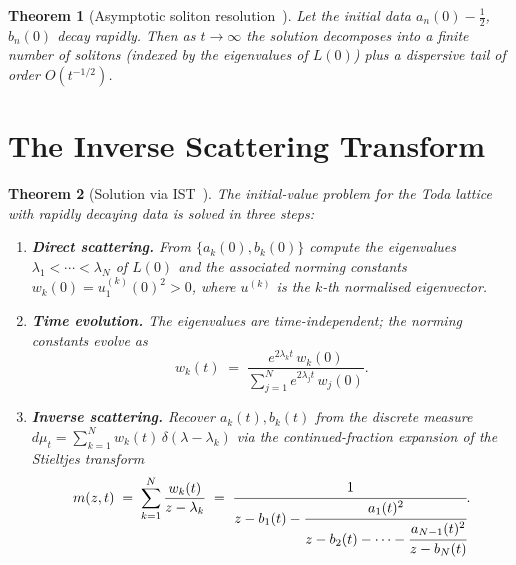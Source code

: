 \documentclass[12pt,a4paper]{article}
\newtheorem{theorem}{Theorem}[section]
\theoremstyle{definition}
\begin{document}
\begin{theorem}[Asymptotic soliton resolution~\cite{Teschl2000}]
Let the initial data $a_n(0)-\tfrac{1}{2}$, $b_n(0)$ decay rapidly.
Then as $t\to\infty$ the solution decomposes into a finite number of
solitons (indexed by the eigenvalues of $L(0)$) plus a dispersive tail
of order $O(t^{-1/2})$.
\end{theorem}

\section{The Inverse Scattering Transform}

\begin{theorem}[Solution via IST~\cite{Teschl2000,Miller2018}]
\label{thm:IST}
The initial-value problem for the Toda lattice with rapidly decaying data is
solved in three steps:
\begin{enumerate}[label=(\roman*)]
  \item \textbf{Direct scattering.} From $\{a_k(0),b_k(0)\}$ compute the
        eigenvalues $\lambda_1 < \cdots < \lambda_N$ of $L(0)$ and the
        associated \emph{norming constants} $w_k(0)=u_1^{(k)}(0)^2>0$,
        where $u^{(k)}$ is the $k$-th normalised eigenvector.
  \item \textbf{Time evolution.}  The eigenvalues are time-independent;
        the norming constants evolve as
        \begin{equation}\label{eq:w_evolve}
          w_k(t) \;=\; \frac{e^{2\lambda_k t}\,w_k(0)}
                             {\displaystyle\sum_{j=1}^N e^{2\lambda_j t}\,w_j(0)}.
        \end{equation}
  \item \textbf{Inverse scattering.}  Recover $a_k(t),b_k(t)$ from the
        discrete measure
        $d\mu_t = \sum_{k=1}^N w_k(t)\,\delta(\lambda - \lambda_k)$
        via the continued-fraction expansion of the Stieltjes transform
        \begin{equation}\label{eq:ContFrac}
          m(z,t) \;=\; \sum_{k=1}^N \frac{w_k(t)}{z-\lambda_k}
          \;=\; \cfrac{1}{z-b_1(t)-\cfrac{a_1(t)^2}{z-b_2(t)-\cdots
          -\cfrac{a_{N-1}(t)^2}{z-b_N(t)}}}.
        \end{equation}
\end{enumerate}
\end{theorem}
\end{document}
